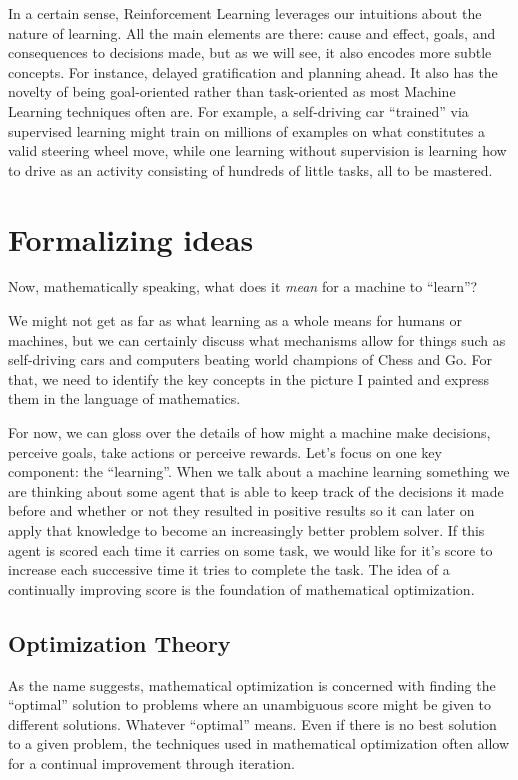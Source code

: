 In a certain sense, Reinforcement Learning leverages our intuitions 
about the nature of learning. All the main elements are there: cause 
and effect, goals, and consequences to decisions made, but as we will 
see, it also encodes more subtle concepts. For instance, delayed 
gratification and planning ahead. It also has the novelty of being 
goal-oriented rather than task-oriented as most Machine Learning 
techniques often are. For example, a self-driving car ``trained'' via 
supervised learning might train on millions of examples on what 
constitutes a valid steering wheel move, while one learning without 
supervision is learning how to drive as an activity consisting of 
hundreds of little tasks, all to be mastered.

\section{Formalizing ideas}
Now, mathematically speaking, what does it \textit{mean} for a machine 
to ``learn''?

We might not get as far as what learning as a whole means for humans 
or machines, but we can certainly discuss what mechanisms allow for 
things such as self-driving cars and computers beating world champions 
of Chess and Go. For that, we need to identify the key concepts in the 
picture I painted and express them in the language of mathematics.

For now, we can gloss over the details of how might a machine make 
decisions, perceive goals, take actions or perceive rewards. Let's 
focus on one key component: the ``learning''. When we talk about a 
machine learning something we are thinking about some agent that is 
able to keep track of the decisions it made before and whether or not 
they resulted in positive results so it can later on apply that 
knowledge to become an increasingly better problem solver. If this 
agent is scored each time it carries on some task, we would like for 
it's score to increase each successive time it tries to complete the 
task. The idea of a continually improving score is the foundation of 
mathematical optimization.

\subsection{Optimization Theory}
As the name suggests, mathematical optimization is concerned with 
finding the ``optimal'' solution to problems where an unambiguous 
score might be given to different solutions. Whatever ``optimal'' 
means. Even if there is no best solution to a given problem, the 
techniques used in mathematical optimization often allow for a 
continual improvement through iteration.

